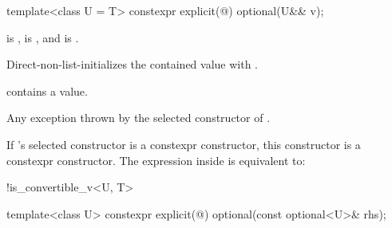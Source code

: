%
\begin{itemdecl}
template<class U = T> constexpr explicit(@\seebelow@) optional(U&& v);
\end{itemdecl}

\begin{itemdescr}
\pnum
\constraints
{} is ,
 is , and
 is .

\pnum
\effects
Direct-non-list-initializes the contained value with .

\pnum
\ensures
{} contains a value.

\pnum
\throws
Any exception thrown by the selected constructor of .

\pnum
\remarks
If 's selected constructor is a constexpr constructor,
this constructor is a constexpr constructor.
The expression inside  is equivalent to:
\begin{codeblock}
!is_convertible_v<U, T>
\end{codeblock}
\end{itemdescr}

%
\begin{itemdecl}
template<class U> constexpr explicit(@\seebelow@) optional(const optional<U>& rhs);
\end{itemdecl}

